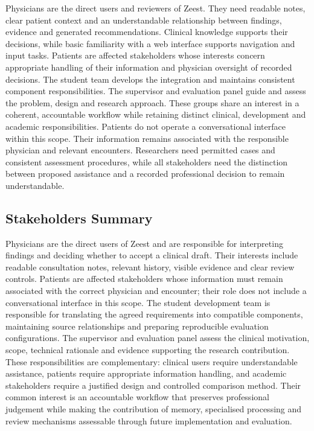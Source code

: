 Physicians are the direct users and reviewers of Zeest. They need readable notes, clear patient context and an understandable relationship between findings, evidence and generated recommendations. Clinical knowledge supports their decisions, while basic familiarity with a web interface supports navigation and input tasks. Patients are affected stakeholders whose interests concern appropriate handling of their information and physician oversight of recorded decisions. The student team develops the integration and maintains consistent component responsibilities. The supervisor and evaluation panel guide and assess the problem, design and research approach. These groups share an interest in a coherent, accountable workflow while retaining distinct clinical, development and academic responsibilities. Patients do not operate a conversational interface within this scope. Their information remains associated with the responsible physician and relevant encounters. Researchers need permitted cases and consistent assessment procedures, while all stakeholders need the distinction between proposed assistance and a recorded professional decision to remain understandable.

\subsection{Stakeholders Summary}

Physicians are the direct users of Zeest and are responsible for interpreting findings and deciding whether to accept a clinical draft. Their interests include readable consultation notes, relevant history, visible evidence and clear review controls. Patients are affected stakeholders whose information must remain associated with the correct physician and encounter; their role does not include a conversational interface in this scope. The student development team is responsible for translating the agreed requirements into compatible components, maintaining source relationships and preparing reproducible evaluation configurations. The supervisor and evaluation panel assess the clinical motivation, scope, technical rationale and evidence supporting the research contribution. These responsibilities are complementary: clinical users require understandable assistance, patients require appropriate information handling, and academic stakeholders require a justified design and controlled comparison method. Their common interest is an accountable workflow that preserves professional judgement while making the contribution of memory, specialised processing and review mechanisms assessable through future implementation and evaluation.

